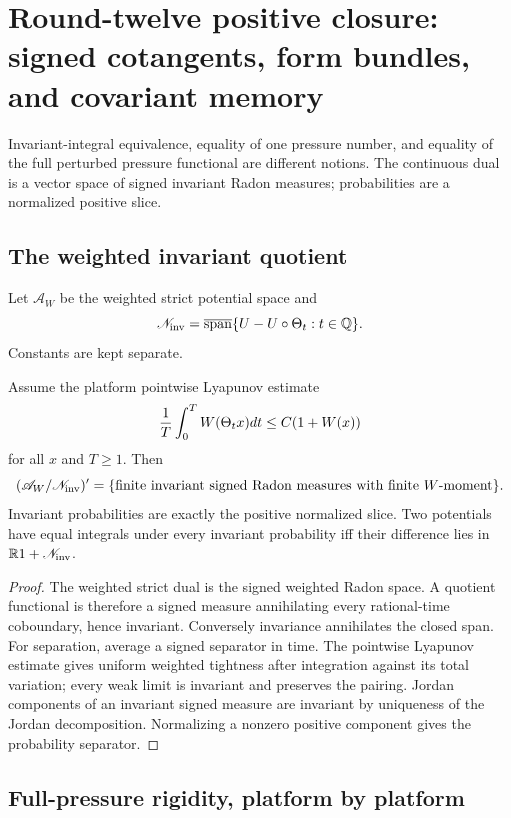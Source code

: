 \section{Round-twelve positive closure: signed cotangents, form bundles, and covariant memory}
\label{sec:r12-c2}

Invariant-integral equivalence, equality of one pressure number, and equality
of the full perturbed pressure functional are different notions.  The
continuous dual is a vector space of signed invariant Radon measures;
probabilities are a normalized positive slice.

\subsection{The weighted invariant quotient}

Let $\mathscr A_W$ be the weighted strict potential space and
\[
 \mathscr N_{\rm inv}=\overline{\operatorname{span}}
 \{U-U\circ\Theta_t:t\in\mathbb Q\}.
\]
Constants are kept separate.

\begin{theorem}
\label{thm:r12-c2-dual}
Assume the platform pointwise Lyapunov estimate
\[
 {1\over T}\int_0^T W(\Theta_tx)dt\le C(1+W(x))
\]
for all $x$ and $T\ge1$.  Then
\[
 (\mathscr A_W/\mathscr N_{\rm inv})'
 =\{\text{finite invariant signed Radon measures with finite }W\text{-moment}
 \}.
\]
Invariant probabilities are exactly the positive normalized slice.  Two
potentials have equal integrals under every invariant probability iff their
difference lies in $\mathbb R1+\mathscr N_{\rm inv}$.
\end{theorem}

\begin{proof}
The weighted strict dual is the signed weighted Radon space.  A quotient
functional is therefore a signed measure annihilating every rational-time
coboundary, hence invariant.  Conversely invariance annihilates the closed
span.  For separation, average a signed separator in time.  The pointwise
Lyapunov estimate gives uniform weighted tightness after integration against
its total variation; every weak limit is invariant and preserves the pairing.
Jordan components of an invariant signed measure are invariant by uniqueness
of the Jordan decomposition.  Normalizing a nonzero positive component gives
the probability separator.
\end{proof}

\subsection{Full-pressure rigidity, platform by platform}

